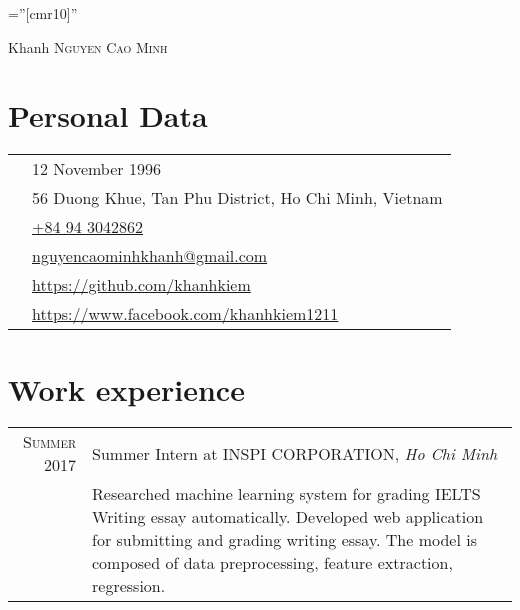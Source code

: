 \documentclass[a4paper,10pt]{article}
\begin{document}

\pagestyle{empty} %

\font\fb=''[cmr10]'' %

\par{\centering
	{\Huge Khanh \textsc{Nguyen Cao Minh}
	}\bigskip\par}

\section{Personal Data}

\begin{tabular}{cl}
	\textsc{\faBirthdayCake} & 12 November 1996                                               \\
	\textsc{\faMapMarker}                 & 56 Duong Khue, Tan Phu District, Ho Chi Minh, Vietnam                                 \\
	\textsc{\faMobile}                   & \href{tel:+84943042862}{+84 94 3042862}                                                                        \\
	\textsc{\faEnvelopeO}                   & \href{mailto:nguyencaominhkhanh@gmail.com}{nguyencaominhkhanh@gmail.com}              \\
	\textsc{\faGithub}                  & \href{https://github.com/khanhkiem}{https://github.com/khanhkiem}                     \\
	\textsc{\faFacebookOfficial}                & \href{https://www.facebook.com/khanhkiem1211}{https://www.facebook.com/khanhkiem1211} \\
\end{tabular}

\section{Work experience}
\begin{tabular}{r|p{11cm}}
	\textsc{Summer 2017} & Summer Intern at \textsc{INSPI CORPORATION}, \emph{Ho Chi Minh}\\&\footnotesize{Researched machine learning system for grading IELTS Writing essay automatically. Developed web application for submitting and grading writing essay. The model is composed of data preprocessing, feature extraction, regression.}\\
\end{tabular}
\end{document}
